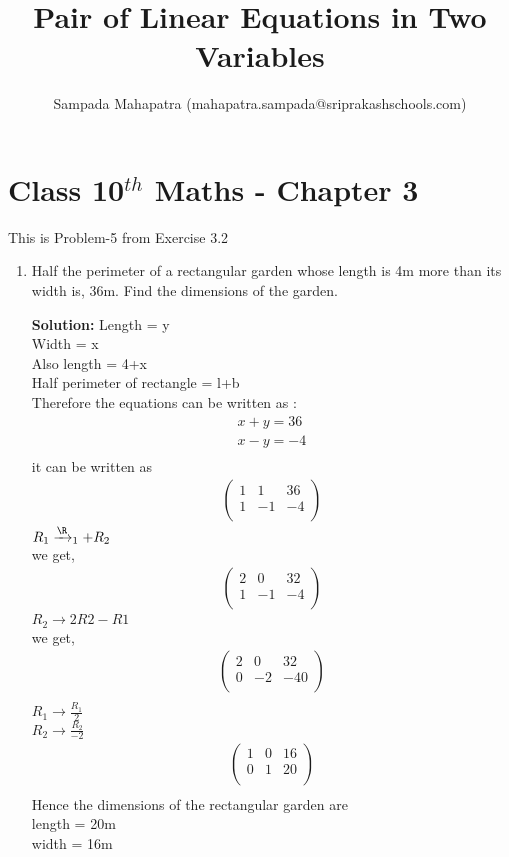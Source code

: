 \documentclass[10pt]{article}
\title{Pair of Linear Equations in Two Variables}
\author{Sampada Mahapatra (mahapatra.sampada@sriprakashschools.com)}
\newcommand{\myvec}[1]{\ensuremath{\begin{pmatrix}#1\end{pmatrix}}}
\newcommand{\solution}{\noindent \textbf{Solution: }}
\begin{document}
\maketitle
\section*{Class 10$^{th}$ Maths - Chapter 3}
This is Problem-5 from Exercise 3.2
\begin{enumerate}
\item Half the perimeter of a rectangular garden whose length is 4m more than its width is, 36m. Find the dimensions of the garden.

\solution
Length = y\\
Width = x\\
Also length = 4+x \\
Half perimeter of rectangle = l+b\\
Therefore the equations can be written as :
\begin{align}
x+y=36\\
x-y=-4\\
\end{align}
it can be written as\\
\begin{align}
\myvec{1&1&36\\1&-1&-4\\}
\end{align}
$R_1 \xrightarrow\R_1+R_2$\\ 
we get,
\begin{align}
\myvec{2&0&32\\1&-1&-4\\}
\end{align}
$R_2 \xrightarrow\ 2R2-R1$\\
we get,
\begin{align}
\myvec{2&0&32\\0&-2&-40\\}\\
\end{align}
$R_1 \xrightarrow\ \frac{R_1}{2}$\\
$R_2 \xrightarrow\ \frac{R_2}{-2}$\\
\begin{align}
\myvec{1&0&16\\0&1&20\\}\\
\end{align}
Hence the dimensions of the rectangular garden are \\
length = 20m \\
width = 16m\\
\end{enumerate}
\end{document}
